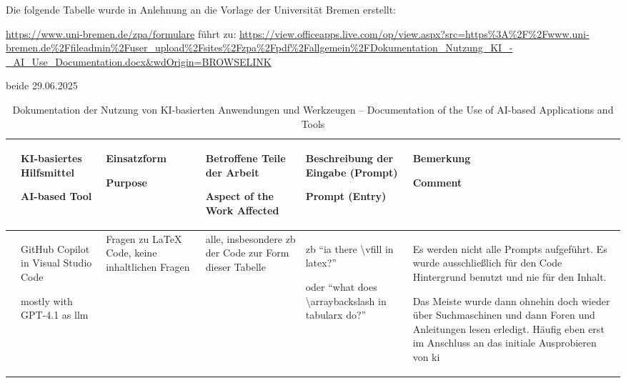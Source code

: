 
Die folgende Tabelle wurde in Anlehnung an die Vorlage der Universität Bremen erstellt:
\footnotesize{
    \url{https://www.uni-bremen.de/zpa/formulare} führt zu: 
    \url{https://view.officeapps.live.com/op/view.aspx?src=https%3A%2F%2Fwww.uni-bremen.de%2Ffileadmin%2Fuser_upload%2Fsites%2Fzpa%2Fpdf%2Fallgemein%2FDokumentation_Nutzung_KI_-_AI_Use_Documentation.docx&wdOrigin=BROWSELINK} 

    beide 29.06.2025
    }

\clearpage
\newpage

        \begin{landscape}
    \begin{table}
\centering 
\begin{tabularx}{\linewidth}{| >{\raggedright\arraybackslash} c || >{\raggedright\arraybackslash} X | >{\raggedright\arraybackslash} X | >{\raggedright\arraybackslash} X | >{\raggedright\arraybackslash} X | >{\raggedright\arraybackslash} X |} %

    \hline
     & 
    KI-basiertes Hilfsmittel 
        
    AI-based Tool & 
    Einsatzform 

    Purpose & 
    Betroffene Teile der Arbeit 
        
    Aspect of the Work Affected & 
    Beschreibung der Eingabe (Prompt) 
  
    Prompt (Entry) & 
    Bemerkung 
    
    Comment\\
    \hline
    \hline
    
    1 & 
    GitHub Copilot in Visual Studio Code
    
    mostly with GPT-4.1 as \gls{llm} & 
    Fragen zu \LaTeX{} Code, keine inhaltlichen Fragen &
    alle, insbesondere \gls{zb} der Code zur Form dieser Tabelle & 
    \gls{zb} \enquote{ia there \textbackslash{}vfill in latex?} 
    
    oder \enquote{what does \textbackslash{}arraybackslash in tabularx do?} & 
    Es werden nicht alle Prompts aufgeführt. Es wurde ausschließlich für den Code Hintergrund benutzt und nie für den Inhalt. 
    
    Das Meiste wurde dann ohnehin doch wieder über Suchmaschinen und dann Foren und Anleitungen lesen erledigt. Häufig eben erst im Anschluss an das initiale Ausprobieren von \gls{ki} \\
    \hline


\end{tabularx}

\caption{Dokumentation der Nutzung von KI-basierten Anwendungen und Werkzeugen -- Documentation of the Use of AI-based Applications and Tools}

\label{KIHilfsmittel}

    \end{table}
        \end{landscape}

